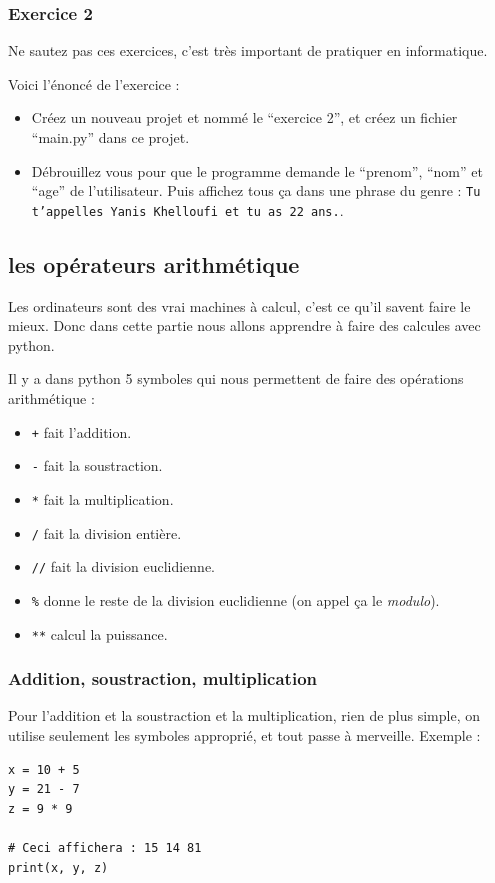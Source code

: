 \documentclass[12pt]{article}
\newcommand{\code}[1]{\colorbox{light-gray}{\texttt{#1}}}
\begin{document}
        \subsubsection{Exercice 2}
            Ne sautez pas ces exercices, c'est très important de pratiquer en informatique.

            Voici l'énoncé de l'exercice :
            \begin{itemize}
                \item Créez un nouveau projet et nommé le ``exercice 2'', et créez un fichier ``main.py'' dans ce
                    projet.
                \item Débrouillez vous pour que le programme demande le ``prenom'', ``nom'' et ``age'' de l'utilisateur.
                    Puis affichez tous ça dans une phrase du genre : \code{Tu t'appelles Yanis Khelloufi et tu as 22 ans.}.
            \end{itemize}


\clearpage

    \subsection{les opérateurs arithmétique}
        Les ordinateurs sont des vrai machines à calcul, c'est ce qu'il savent faire le mieux. Donc dans cette partie
        nous allons apprendre à faire des calcules avec python.

        Il y a dans python 5 symboles qui nous permettent de faire des opérations arithmétique :
        \begin{itemize}
            \item \code{+} fait l'addition.
            \item \code{-} fait la soustraction.
            \item \code{*} fait la multiplication.
            \item \code{/} fait la division entière.
            \item \code{//} fait la division euclidienne.
            \item \code{\%} donne le reste de la division euclidienne (on appel ça le \emph{modulo}).
            \item \code{**} calcul la puissance.
        \end{itemize}

        \subsubsection{Addition, soustraction, multiplication}
            Pour l'addition et la soustraction et la multiplication, rien de plus simple, on utilise seulement 
            les symboles approprié, et tout passe à merveille. Exemple :
            \begin{lstlisting}[style=code]
x = 10 + 5
y = 21 - 7
z = 9 * 9

# Ceci affichera : 15 14 81
print(x, y, z) 
            \end{lstlisting}
\end{document}
